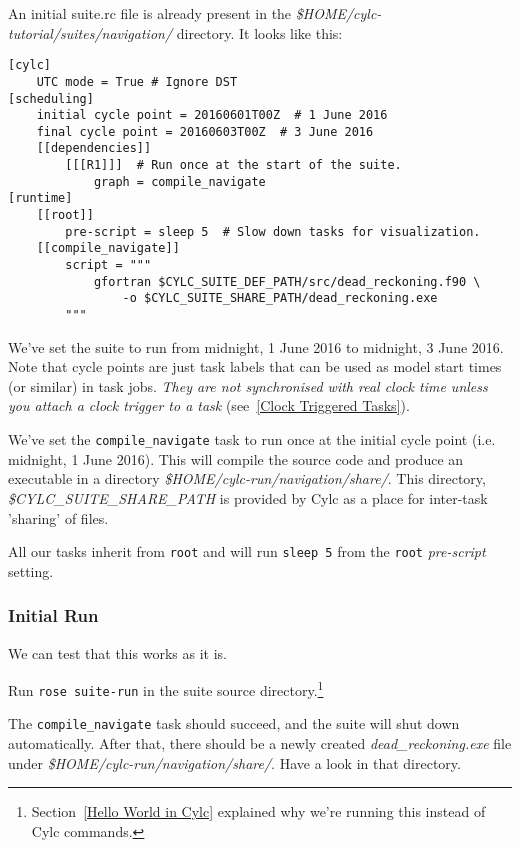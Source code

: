 An initial suite.rc file is already present in the {\em \$HOME/cylc-tutorial/suites/navigation/} directory.
It looks like this:

\lstset{language=suiterc}
\begin{lstlisting}[columns=fullflexible]
[cylc]
    UTC mode = True # Ignore DST
[scheduling]
    initial cycle point = 20160601T00Z  # 1 June 2016
    final cycle point = 20160603T00Z  # 3 June 2016
    [[dependencies]]
        [[[R1]]]  # Run once at the start of the suite.
            graph = compile_navigate
[runtime]
    [[root]]
        pre-script = sleep 5  # Slow down tasks for visualization.
    [[compile_navigate]]
        script = """
            gfortran $CYLC_SUITE_DEF_PATH/src/dead_reckoning.f90 \
                -o $CYLC_SUITE_SHARE_PATH/dead_reckoning.exe
        """
\end{lstlisting}

    We've set the suite to run from midnight, 1 June 2016 to midnight, 3 June
    2016. Note that cycle points are just task labels that can be used as
    model start times (or similar) in task jobs. {\em They are not synchronised
    with real clock time unless you attach a clock trigger to a task}
    (see~\ref{Clock Triggered Tasks}).
 
    We've set the \lstinline{compile_navigate} task to run once at the initial cycle point (i.e. midnight, 1 June 2016). This will compile the source code and produce an executable in a directory {\em \$HOME/cylc-run/navigation/share/}. This directory, {\em \$CYLC\_SUITE\_SHARE\_PATH} is provided by Cylc as a place for inter-task 'sharing' of files.

    All our tasks inherit from \lstinline{root} and will run \lstinline{sleep 5} from the \lstinline{root} {\em pre-script} setting.

\subsubsection{Initial Run}

    We can test that this works as it is.
    
    Run \lstinline{rose suite-run} in the suite source directory.\footnote {Section~\ref{Hello World in Cylc} explained why we're running this instead of Cylc commands.}
    
    The \lstinline{compile_navigate} task should succeed, and the suite will shut down automatically. After that, there should be a newly created {\em dead\_reckoning.exe} file under {\em \$HOME/cylc-run/navigation/share/}. Have a look in that directory.

